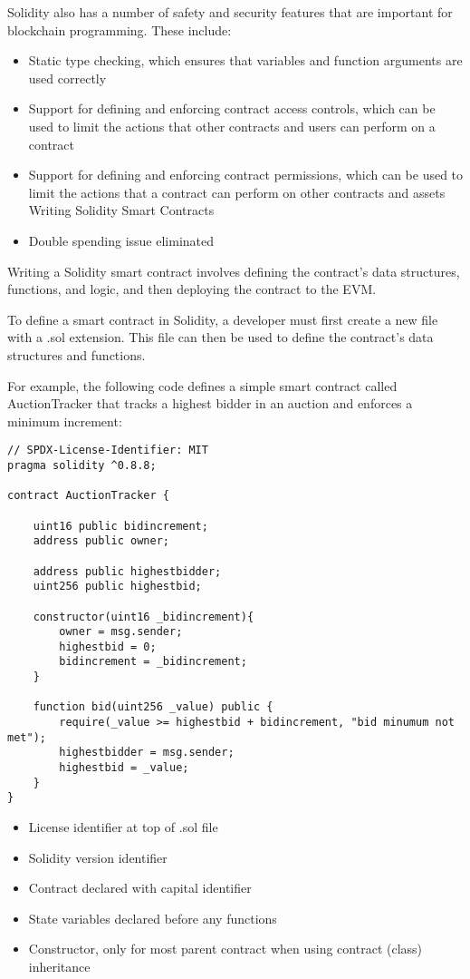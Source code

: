 \documentclass{article}
\theoremstyle{theorem}
\theoremstyle{definition}
\theoremstyle{remark}
\begin{document}
Solidity also has a number of safety and security features that are important for blockchain programming. These include:

\begin{itemize}
    \item Static type checking, which ensures that variables and function arguments are used correctly
\item Support for defining and enforcing contract access controls, which can be used to
limit the actions that other contracts and users can perform on a contract
\item Support for defining and enforcing contract permissions, which can be used to limit the actions that a contract can perform on other contracts and assets
Writing Solidity Smart Contracts
\item Double spending issue eliminated

\end{itemize}

\medskip\noindent
Writing a Solidity smart contract involves defining the contract's data structures, functions, and logic, and then deploying the contract to the EVM.

\medskip\noindent
To define a smart contract in Solidity, a developer must first create a new file with a .sol extension. This file can then be used to define the contract's data structures and functions.

\medskip\noindent
For example, the following code defines a simple smart contract called AuctionTracker that tracks a highest bidder in an auction and enforces a minimum increment:

\begin{lstlisting}
// SPDX-License-Identifier: MIT
pragma solidity ^0.8.8;

contract AuctionTracker {

    uint16 public bidincrement;
    address public owner;
    
    address public highestbidder;
    uint256 public highestbid;
    
    constructor(uint16 _bidincrement){
        owner = msg.sender;
        highestbid = 0;
        bidincrement = _bidincrement;
    }

    function bid(uint256 _value) public {
        require(_value >= highestbid + bidincrement, "bid minumum not met");
        highestbidder = msg.sender;
        highestbid = _value;
    }
}
\end{lstlisting}

\begin{itemize}
    \item License identifier at top of .sol file
    \item Solidity version identifier
    \item Contract declared with capital identifier
    \item State variables declared before any functions
    \item Constructor, only for most parent contract when using contract (class) inheritance
\end{itemize}
\end{document}
